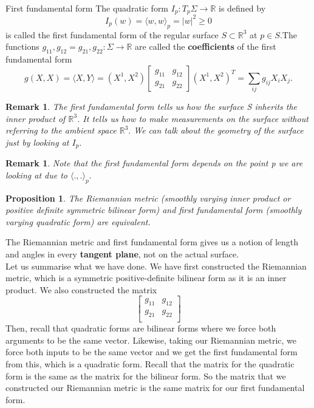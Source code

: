 \documentclass[twoside]{article}
\newtheorem{proposition}[theorem]{Proposition}
\newtheorem{remark}[theorem]{Remark}
\begin{document}
\begin{definition_exam}{First fundamental form}{} The quadratic form $I_p: T_p\Sigma \rightarrow \mathbb{R}$ is defined by 
$$
I_p(w) = \langle w, w \rangle_p = |w|^2 \geq 0
$$
is called the first fundamental form of the regular surface $S \subset \mathbb{R}^3$ at $p \in S.$\newline The functions $g_{11}, g_{12} = g_{21}, g_{22}: \Sigma \rightarrow \mathbb{R}$ are called the \textbf{coefficients} of the first fundamental form
$$
g(X,X) = \langle X,Y \rangle = (X^1, X^2)\begin{bmatrix} g_{11} & g_{12} \\ g_{21} & g_{22}
\end{bmatrix}(X^1, X^2)^T = \sum_{ij}g_{ij}X_iX_j.
$$
\end{definition_exam}

\begin{remark}The first fundamental form tells us how the surface S inherits the inner product of $\mathbb{R}^3$. It tells us how to make measurements on the surface without referring to the ambient space $\mathbb{R}^3.$ We can talk about the geometry of the surface just by looking at $I_p.$
\end{remark}

\begin{remark}Note that the first fundamental form depends on the point p we are looking at due to $\langle .,. \rangle_p.$
\end{remark}

\begin{proposition}The Riemannian metric (smoothly varying inner product or positive definite symmetric bilinear form) and first fundamental form (smoothly varying quadratic form) are equivalent.
\end{proposition}

The Riemannian metric and first fundamental form gives us a notion of length and angles in every \textbf{tangent plane}, not on the actual surface.\\
Let us summarise what we have done. We have first constructed the Riemannian metric, which is a symmetric positive-definite bilinear form as it is an inner product. We also constructed the matrix $$
\begin{bmatrix}
g_{11} & g_{12}\\
g_{21} & g_{22}\\
\end{bmatrix}
$$ 
Then, recall that quadratic forms are bilinear forms where we force both arguments to be the same vector. Likewise, taking our Riemannian metric, we force both inputs to be the same vector and we get the first fundamental form from this, which is a quadratic form. Recall that the matrix for the quadratic form is the same as the matrix for the bilinear form. So the matrix that we constructed our Riemannian metric is the same matrix for our first fundamental form.
\end{document}
